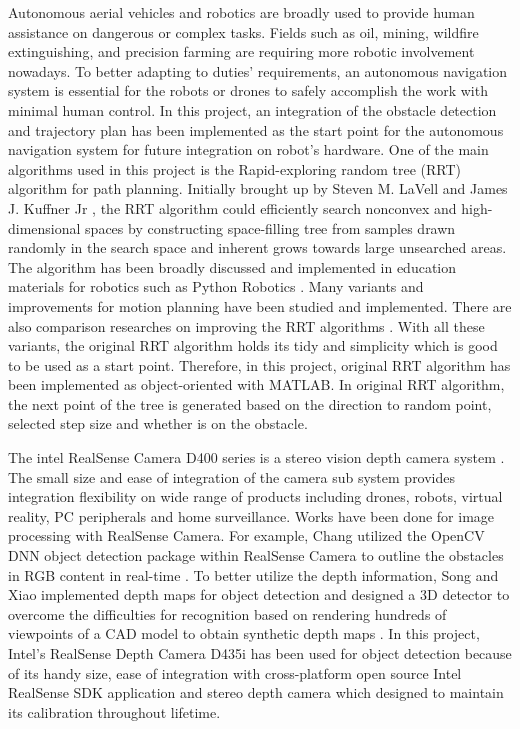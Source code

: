 \documentclass[
  oneside]{ubcthesis}
\begin{document}
Autonomous aerial vehicles and robotics are broadly used to provide human assistance on dangerous or complex tasks. Fields such as oil, mining, wildfire extinguishing, and precision farming are requiring more robotic involvement nowadays. To better adapting to duties' requirements, an autonomous navigation system is essential for the robots or drones to safely accomplish the work with minimal human control. In this project, an integration of the obstacle detection and trajectory plan has been implemented as the start point for the autonomous navigation system for future integration on robot's hardware.
One of the main algorithms used in this project is the Rapid-exploring random tree (RRT) algorithm for path planning. Initially brought up by Steven M. LaVell and James J. Kuffner Jr \citep{rrt}, the RRT algorithm could efficiently search nonconvex and high-dimensional spaces by constructing space-filling tree from samples drawn randomly in the search space and inherent grows towards large unsearched areas. The algorithm has been broadly discussed and implemented in education materials for robotics such as Python Robotics \citep{pythonRobotics}. Many variants and improvements for motion planning have been studied and implemented. There are also comparison researches on improving the RRT algorithms \citep{rrtCompare}. With all these variants, the original RRT algorithm holds its tidy and simplicity which is good to be used as a start point. Therefore, in this project, original RRT algorithm has been implemented as object-oriented with MATLAB. In original RRT algorithm, the next point of the tree is generated based on the direction to random point, selected step size and whether is on the obstacle.

The intel RealSense Camera D400 series is a stereo vision depth camera system \citep{realSenseD400}. The small size and ease of integration of the camera sub system provides integration flexibility on wide range of products including drones, robots, virtual reality, PC peripherals and home surveillance. Works have been done for image processing with RealSense Camera. For example, Chang utilized the OpenCV DNN object detection package within RealSense Camera to outline the obstacles in RGB content in real-time \citep{rscvdnn}. To better utilize the depth information, Song and Xiao implemented depth maps for object detection and designed a 3D detector to overcome the difficulties for recognition based on rendering hundreds of viewpoints of a CAD model to obtain synthetic depth maps \citep{slidingShapes}. In this project, Intel's RealSense Depth Camera D435i has been used for object detection because of its handy size, ease of integration with cross-platform open source Intel RealSense SDK application and stereo depth camera which designed to maintain its calibration throughout lifetime.
\end{document}
